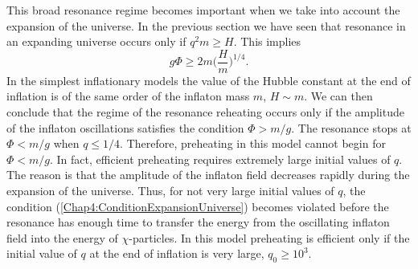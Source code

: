 \documentclass[11pt,a4paper,twoside]{book}
\begin{document}
This broad resonance regime becomes important when we take into account the expansion of the universe. In the previous section we have seen that resonance in an expanding universe occurs only if $ q^{2}m \ge H $. This implies
\begin{equation}
	\label{Chap4:ConditionExpansionUniverse}
	g\Phi \ge 2m\Bigg(\frac{H}{m}\Bigg)^{1/4}.
\end{equation}
In the simplest inflationary models the value of the Hubble constant at the end of inflation is of the same order of the inflaton mass $ m $, $ H \sim m $. We can then conclude that the regime of the resonance reheating occurs only if the amplitude of the inflaton oscillations satisfies the condition $ \Phi > m/g $. The resonance stops at $ \Phi < m/g $ when $ q \le 1/4 $. Therefore, preheating in this model cannot begin for $ \Phi < m/g $. In fact, efficient preheating requires extremely large initial values of $ q $. The reason is that the amplitude of the inflaton field decreases rapidly during the expansion of the universe. Thus, for not very large initial values of $ q $, the condition (\ref{Chap4:ConditionExpansionUniverse}) becomes violated before the resonance has enough time to transfer the energy from the oscillating inflaton field into the energy of $ \chi $-particles. In this model preheating is efficient only if the initial value of $ q $ at the end of inflation is very large, $ q_{0} \ge 10^{3} $.
\end{document}
